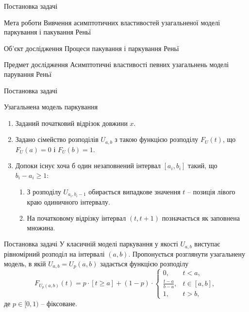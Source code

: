 \begin{frame}{Постановка задачі}
	\vspace{-8pt}
	\begin{block}{Мета роботи}
		 Вивчення асимптотичних властивостей узагальненої моделі паркування і пакування Реньї
	\end{block} 

	\begin{block}{Об'єкт дослідження}
		Процеси пакування і паркування Реньї
	\end{block}
	
	\begin{block}{Предмет дослідження}
		Асимптотичні властивості певних узагальнень моделі парування Реньї
	\end{block}
\end{frame}

\begin{frame}{Постановка задачі}
	\begin{block}{Узагальнена модель паркування}
	\begin{enumerate}
		\item Заданий початковий відрізок довжини $x$.
		\item Задано сімейство розподілів $U_{a,b}$ з такою функцією розподілу $F_{U}(t)$, що $F_{U}(a)=0$ і $F_{U}(b)=1$.
		\item Допоки існує хоча б один незаповнений інтервал $[a_i, b_i]$ такий, що $b_i-a_i \geq 1$:
		\begin{enumerate}
			\item З розподілу $U_{a_i,b_i - 1}$ обирається випадкове значення $t$ -- позиція лівого краю одиничного інтервалу.
			\item На початковому відрізку інтервал $(t, t+1)$ позначається як заповнена множина.
		\end{enumerate}
	\end{enumerate}
	\end{block}
\end{frame}

\begin{frame}{Постановка задачі}
	У класичній моделі паркування у якості $U_{a,b}$ виступає рівномірний розподіл на інтервалі $(a,b)$. Пропонується розглянути узагальнену модель, в якій  $U_{a,b}=U_{p}(a,b)$ задається функцією розподілу
	\begin{equation}
	\label{eq:general_dist}
	F_{U_{p}(a,b)}(t)=p \cdot [t \geq a] + (1-p)\cdot\begin{cases}
	0, &t<a,\\
	\frac{t-a}{b-a}, &t \in[a,b],\\
	1, &t > b,
	\end{cases}
	\end{equation}
	де $p \in [0,1)$ -- фіксоване.
\note{
}
\end{frame}

